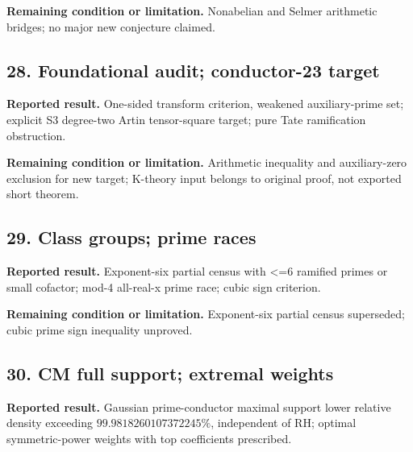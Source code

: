 \textbf{Remaining condition or limitation.} Nonabelian and Selmer arithmetic bridges; no major new conjecture claimed.

\subsection*{28. Foundational audit; conductor-23 target}

\href{https://github.com/VladimirReshetnikov/ProveIt/blob/274841c1cb137aafbb60ab5f519c51fd42eee98e/docs/incoming/grh_transfer_analysis_2026-11-25.zip}{}

\textbf{Reported result.} One-sided transform criterion, weakened auxiliary-prime set; explicit S3 degree-two Artin tensor-square target; pure Tate ramification obstruction.

\textbf{Remaining condition or limitation.} Arithmetic inequality and auxiliary-zero exclusion for new target; K-theory input belongs to original proof, not exported short theorem.

\subsection*{29. Class groups; prime races}

\href{https://github.com/VladimirReshetnikov/ProveIt/blob/274841c1cb137aafbb60ab5f519c51fd42eee98e/docs/incoming/grh_transfers.zip}{}

\textbf{Reported result.} Exponent-six partial census with <=6 ramified primes or small cofactor; mod-4 all-real-x prime race; cubic sign criterion.

\textbf{Remaining condition or limitation.} Exponent-six partial census superseded; cubic prime sign inequality unproved.

\subsection*{30. CM full support; extremal weights}

\href{https://github.com/VladimirReshetnikov/ProveIt/blob/274841c1cb137aafbb60ab5f519c51fd42eee98e/docs/incoming/grh_transfers_singular_moduli_and_symmetric_powers.zip}{}

\textbf{Reported result.} Gaussian prime-conductor maximal support lower relative density exceeding $99.9818260107372245\%$, independent of RH; optimal symmetric-power weights with top coefficients prescribed.


